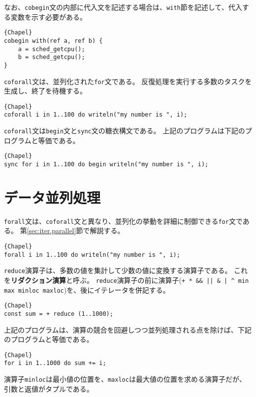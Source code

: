 \documentclass[10pt,a4paper]{book}
\begin{document}
なお、\verb#cobegin#文の内部に代入文を記述する場合は、\verb#with#節を記述して、代入する変数を示す必要がある。

\begin{Verbatim}{Chapel}
cobegin with(ref a, ref b) {
	a = sched_getcpu();
	b = sched_getcpu();
}
\end{Verbatim}

\verb#coforall#文は、並列化された\verb#for#文である。
反復処理を実行する多数のタスクを生成し、終了を待機する。

\begin{Verbatim}{Chapel}
coforall i in 1..100 do writeln("my number is ", i);
\end{Verbatim}

\verb#coforall#文は\verb#begin#文と\verb#sync#文の糖衣構文である。
上記のプログラムは下記のプログラムと等価である。

\begin{Verbatim}{Chapel}
sync for i in 1..100 do begin writeln("my number is ", i);
\end{Verbatim}

\section{データ並列処理}

\verb#forall#文は、\verb#coforall#文と異なり、並列化の挙動を詳細に制御できる\verb#for#文である。
第\ref{sec:iter.parallel}節で解説する。

\begin{Verbatim}{Chapel}
forall i in 1..100 do writeln("my number is ", i);
\end{Verbatim}

\verb#reduce#演算子は、多数の値を集計して少数の値に変換する演算子である。
これを\textbf{リダクション演算}と呼ぶ。
\verb#reduce#演算子の前に演算子(\verb#+ * && || & | ^ min max minloc maxloc#)を、後にイテレータを併記する。

\begin{Verbatim}{Chapel}
const sum = + reduce (1..1000);
\end{Verbatim}

上記のプログラムは、演算の競合を回避しつつ並列処理される点を除けば、下記のプログラムと等価である。

\begin{Verbatim}{Chapel}
for i in 1..1000 do sum += i;
\end{Verbatim}

演算子\verb#minloc#は最小値の位置を、\verb#maxloc#は最大値の位置を求める演算子だが、引数と返値がタプルである。
\end{document}
